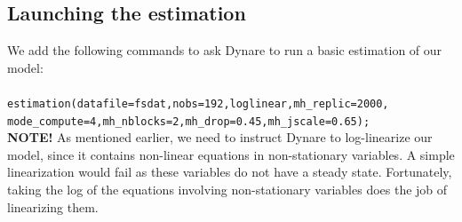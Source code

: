 \subsection{Launching the estimation}
We add the following commands to ask Dynare to run a basic estimation of our model:\\
\\
\texttt{estimation(datafile=fsdat,nobs=192,loglinear,mh\_replic=2000,\\
mode\_compute=4,mh\_nblocks=2,mh\_drop=0.45,mh\_jscale=0.65);}\\

\textsf{\textbf{NOTE!}} As mentioned earlier, we need to instruct Dynare to log-linearize our model, since it contains non-linear equations in non-stationary variables. A simple linearization would fail as these variables do not have a steady state. Fortunately, taking the log of the equations involving non-stationary variables does the job of linearizing them.\\

